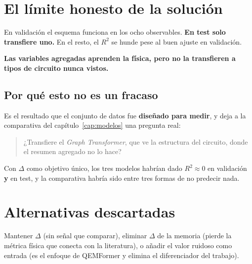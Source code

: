 \section{El límite honesto de la solución}
\label{sec:limite}
En validación el esquema funciona en los ocho observables. \textbf{En test solo transfiere
uno.} En el resto, el $R^2$ se hunde pese al buen ajuste en validación.

\textbf{Las variables agregadas aprenden la física, pero no la transfieren a tipos de circuito
nunca vistos.}

\subsection{Por qué esto no es un fracaso}
Es el resultado que el conjunto de datos fue \textbf{diseñado para medir}, y deja a la
comparativa del capítulo~\ref{cap:modelos} una pregunta real:

\begin{quote}
¿Transfiere el \textit{Graph Transformer}, que ve la estructura del circuito, donde el
resumen agregado no lo hace?
\end{quote}

Con $\Delta$ como objetivo único, los tres modelos habrían dado $R^2 \approx 0$ en validación
\textbf{y} en test, y la comparativa habría sido entre tres formas de no predecir nada.

\section{Alternativas descartadas}
\label{sec:alternativas_objetivo}
Mantener $\Delta$ (sin señal que comparar), eliminar $\Delta$ de la memoria (pierde la métrica
física que conecta con la literatura), o añadir el valor ruidoso como entrada (es el enfoque
de QEMFormer y elimina el diferenciador del trabajo).
